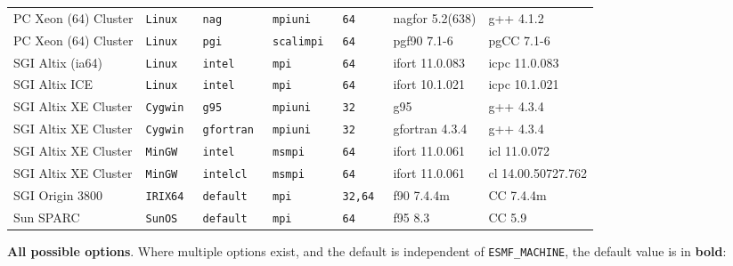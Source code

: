 \begin{tabular}{lllllll}
PC Xeon (64) Cluster  &\tt Linux  &\tt nag          &\tt mpiuni     &\tt 64              & nagfor \footnotesize 5.2(638)      & g++  \footnotesize 4.1.2        \\ %
PC Xeon (64) Cluster  &\tt Linux  &\tt pgi          &\tt scalimpi   &\tt 64              & pgf90 \footnotesize 7.1-6          & pgCC \footnotesize 7.1-6        \\ %
SGI Altix (ia64)      &\tt Linux  &\tt intel        &\tt mpi        &\tt 64              & ifort \footnotesize 11.0.083       & icpc \footnotesize 11.0.083     \\ %
SGI Altix ICE         &\tt Linux  &\tt intel        &\tt mpi        &\tt 64              & ifort \footnotesize 10.1.021       & icpc \footnotesize 10.1.021     \\ %
SGI Altix XE Cluster  &\tt Cygwin &\tt g95          &\tt mpiuni     &\tt 32              & g95 \footnotesize                  & g++  \footnotesize 4.3.4        \\ %
SGI Altix XE Cluster  &\tt Cygwin &\tt gfortran     &\tt mpiuni     &\tt 32              & gfortran \footnotesize 4.3.4       & g++  \footnotesize 4.3.4        \\ %
SGI Altix XE Cluster  &\tt MinGW  &\tt intel        &\tt msmpi      &\tt 64              & ifort \footnotesize 11.0.061       & icl  \footnotesize 11.0.072     \\ %
SGI Altix XE Cluster  &\tt MinGW  &\tt intelcl      &\tt msmpi      &\tt 64              & ifort \footnotesize 11.0.061       & cl  \footnotesize 14.00.50727.762 \\ %
SGI Origin 3800       &\tt IRIX64 &\tt default      &\tt mpi        &\tt 32,64           & f90 \footnotesize 7.4.4m           & CC \footnotesize 7.4.4m         \\ %
Sun SPARC             &\tt SunOS  &\tt default      &\tt mpi        &\tt 64              & f95 \footnotesize 8.3              & CC \footnotesize 5.9               %
\end{tabular}

\vspace{1ex}

{\bf All possible options}. Where multiple options exist, and the default is independent
of {\tt ESMF\_MACHINE}, the default value is in {\bf bold}:

\vspace{1ex}


